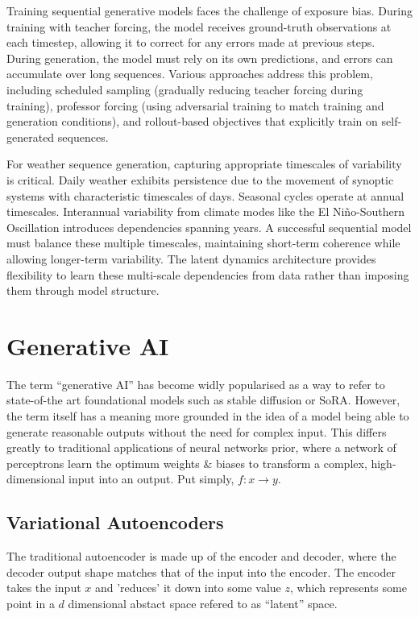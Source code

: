 Training sequential generative models faces the challenge of exposure bias. During training 
with teacher forcing, the model receives ground-truth observations at each timestep, allowing 
it to correct for any errors made at previous steps. During generation, the model must rely on 
its own predictions, and errors can accumulate over long sequences. Various approaches address 
this problem, including scheduled sampling (gradually reducing teacher forcing during training), 
professor forcing (using adversarial training to match training and generation conditions), 
and rollout-based objectives that explicitly train on self-generated sequences.

For weather sequence generation, capturing appropriate timescales of variability is critical. 
Daily weather exhibits persistence due to the movement of synoptic systems with characteristic 
timescales of days. Seasonal cycles operate at annual timescales. Interannual variability from 
climate modes like the El Niño-Southern Oscillation introduces dependencies spanning years. A 
successful sequential model must balance these multiple timescales, maintaining short-term 
coherence while allowing longer-term variability. The latent dynamics architecture provides 
flexibility to learn these multi-scale dependencies from data rather than imposing them through 
model structure.

\section{Generative AI}

The term ``generative AI'' has become widly popularised as a way to refer to state-of-the art 
foundational models such as stable diffusion or SoRA. However, the term itself has a meaning
more grounded in the idea of a model being able to generate reasonable outputs without the
need for complex input. This differs greatly to traditional applications of neural networks
prior, where a network of perceptrons learn the optimum weights \& biases to transform a 
complex, high-dimensional input into an output. Put simply, $f: x \rightarrow y$.

\subsection{Variational Autoencoders}

The traditional autoencoder is made up of the encoder and decoder, where the decoder output 
shape matches that of the input into the encoder. The encoder takes the input $x$ and 'reduces'
it down into some value $z$, which represents some point in a $d$ dimensional abstact space
refered to as ``latent'' space.

